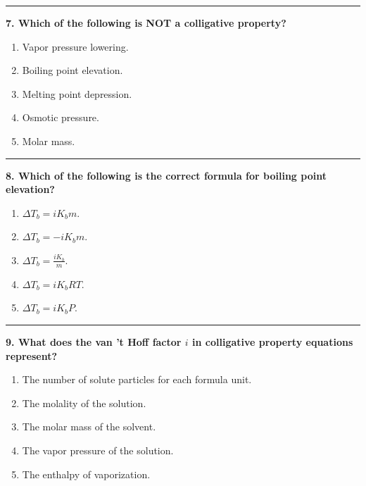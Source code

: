 \documentclass[
  9pt,
]{extbook}
\providecommand{\tightlist}{%
  \setlength{\itemsep}{0pt}\setlength{\parskip}{0pt}}
\theoremstyle{definition}
\theoremstyle{definition}
\theoremstyle{definition}
\theoremstyle{definition}
\theoremstyle{remark}
\begin{document}
\begin{center}\rule{0.5\linewidth}{0.5pt}\end{center}

\textbf{7. Which of the following is NOT a colligative property?}

\begin{enumerate}
\def\labelenumi{\alph{enumi}.}
\tightlist
\item
  Vapor pressure lowering.
\item
  Boiling point elevation.
\item
  Melting point depression.
\item
  Osmotic pressure.
\item
  Molar mass.
\end{enumerate}

\begin{center}\rule{0.5\linewidth}{0.5pt}\end{center}

\textbf{8. Which of the following is the correct formula for boiling point elevation?}

\begin{enumerate}
\def\labelenumi{\alph{enumi}.}
\tightlist
\item
  \(\Delta T_b = iK_b m\).
\item
  \(\Delta T_b = -iK_b m\).
\item
  \(\Delta T_b = \frac{iK_b}{m}\).
\item
  \(\Delta T_b = iK_b RT\).
\item
  \(\Delta T_b = iK_b P\).
\end{enumerate}

\begin{center}\rule{0.5\linewidth}{0.5pt}\end{center}

\textbf{9. What does the van 't Hoff factor \(i\) in colligative property equations represent?}

\begin{enumerate}
\def\labelenumi{\alph{enumi}.}
\tightlist
\item
  The number of solute particles for each formula unit.
\item
  The molality of the solution.
\item
  The molar mass of the solvent.
\item
  The vapor pressure of the solution.
\item
  The enthalpy of vaporization.
\end{enumerate}
\end{document}

